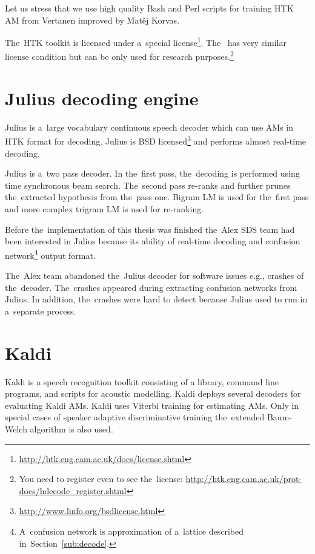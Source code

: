 Let us stress that we use high quality Bash and Perl scripts for training \ac{HTK} \ac{AM} from Vertanen improved by Matěj Korvas.\cite{vertanen_baseline_2006}\cite{korvas_2014}

The~\ac{HTK} toolkit is licensed under a~special license\footnote{\url{http://htk.eng.cam.ac.uk/docs/license.shtml}}.
The~ has very similar license condition but can be only used for research purposes.\footnote{You need to register even to see the~license: \url{http://htk.eng.cam.ac.uk/prot-docs/hdecode_register.shtml}}

\section{Julius decoding engine}
\label{sec:back_julius}

Julius is a~large vocabulary continuous speech decoder which can use \acp{AM} in \ac{HTK} format for decoding.\cite{lee2009julius}
Julius is BSD licensed\footnote{\url{http://www.linfo.org/bsdlicense.html}} and performs almost real-time decoding.

Julius is a~two pass decoder. 
In the~first pass, the~decoding is performed using time synchronous beam search.
The~second pass re-ranks and further prunes the~extracted hypothesis from the~pass one.
Bigram \ac{LM} is used for the~first pass and more complex trigram \ac{LM} is used for re-ranking.

Before the~implementation of this thesis was finished the~Alex \ac{SDS} team had been interested in Julius because its ability of real-time decoding and confusion network\footnote{A~confusion network is approximation of a~lattice described in~Section~\ref{sub:decode}.} output format.

The~Alex team abandoned the~Julius decoder for software issues e.g., crashes of the~decoder. 
The~crashes appeared during extracting confusion networks from Julius. 
In addition, the~crashes were hard to detect because Julius used to run in a~separate process.

\section{Kaldi}
\label{sec:back_kaldi}

Kaldi is a speech recognition toolkit consisting of a library, command line programs, and scripts for acoustic modelling.
Kaldi deploys several decoders for evaluating Kaldi \acp{AM}.
Kaldi uses Viterbi training for estimating \acp{AM}. 
Only in special cases of speaker adaptive discriminative training the~extended Baum-Welch algorithm is also used\cite{povey2011kaldi}.

